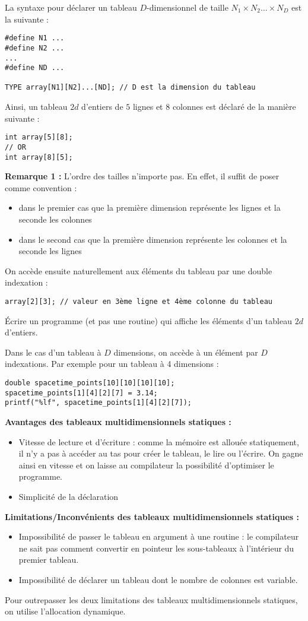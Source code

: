 \documentclass[../../../main.tex]{subfiles}
\begin{document}
La syntaxe pour déclarer un tableau $D$-dimensionnel de taille $N_{1}\times{N_{2}}\dots\times{N_{D}}$ est la suivante :
\begin{verbatim}
#define N1 ...
#define N2 ...
...
#define ND ...

TYPE array[N1][N2]...[ND]; // D est la dimension du tableau
\end{verbatim}
Ainsi, un tableau $2d$ d'entiers de $5$ lignes et 8 colonnes est déclaré de la manière suivante :
\begin{verbatim}
int array[5][8];
// OR
int array[8][5];
\end{verbatim}
\textbf{Remarque 1 :} L'ordre des tailles n'importe pas. En effet, il suffit de poser comme convention :
\begin{itemize}
	\item dans le premier cas que la première dimension représente les lignes et la seconde les colonnes
	\item dans le second cas que la première dimension représente les colonnes et la seconde les lignes
\end{itemize}
On accède ensuite naturellement aux éléments du tableau par une double indexation :
\begin{verbatim}
array[2][3]; // valeur en 3ème ligne et 4ème colonne du tableau
\end{verbatim}
 Écrire un programme (et pas une routine) qui affiche les éléments d'un tableau $2d$ d'entiers.
 
Dans le cas d'un tableau à $D$ dimensions, on accède à un élément par $D$ indexations. Par exemple pour un tableau à 4 dimensions :
\begin{verbatim}
double spacetime_points[10][10][10][10];
spacetime_points[1][4][2][7] = 3.14;
printf("%lf", spacetime_points[1][4][2][7]);
\end{verbatim}
\textbf{Avantages des tableaux multidimensionnels statiques :}
\begin{itemize}
	\item Vitesse de lecture et d'écriture : comme la mémoire est allouée statiquement, il n'y a pas à accéder au tas pour créer le tableau, le lire ou l'écrire. On gagne ainsi en vitesse et on laisse au compilateur la possibilité d'optimiser le programme.
	\item Simplicité de la déclaration
\end{itemize}
\textbf{Limitations/Inconvénients des tableaux multidimensionnels statiques :}
\begin{itemize}
	\item Impossibilité de passer le tableau en argument à une routine : le compilateur ne sait pas comment convertir en pointeur les sous-tableaux à l'intérieur du premier tableau.
	\item Impossibilité de déclarer un tableau dont le nombre de colonnes est variable.
\end{itemize}
Pour outrepasser les deux limitations des tableaux multidimensionnels statiques, on utilise l'allocation dynamique.
\end{document}

